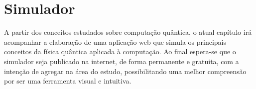 \section{Simulador} 
\label{simulator}
A partir dos conceitos estudados sobre computação quântica, o atual capítulo irá acompanhar a elaboração  de uma aplicação web que simula os principais conceitos da física quântica aplicada à computação. Ao final espera-se que o simulador seja publicado na internet, de forma permanente e gratuita, com a intenção de agregar na área do estudo, possibilitando uma melhor compreensão por ser uma ferramenta visual e intuitiva. 
\newpage